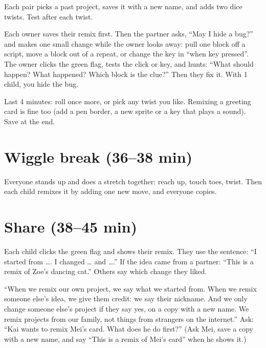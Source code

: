Each pair picks a past project, saves it with a new name, and adds two dice twists. Test after each twist.

\begin{bughunt}
Each owner saves their remix first. Then the partner asks, \enquote{May I hide a bug?} and makes one small change while the owner looks away: pull one block off a script, move a block out of a repeat, or change the key in \enquote{when key pressed}. The owner clicks the green flag, tests the click or key, and hunts: \enquote{What should happen? What happened? Which block is the clue?} Then they fix it. With 1 child, you hide the bug.
\end{bughunt}

\begin{freebuild}
Last 4 minutes: roll once more, or pick any twist you like. Remixing a greeting card is fine too (add a pen border, a new sprite or a key that plays a sound). Save at the end.
\end{freebuild}

\section{Wiggle break (36--38 min)}
Everyone stands up and does a stretch together: reach up, touch toes, twist. Then each child remixes it by adding one new move, and everyone copies.

\section{Share (38--45 min)}
\begin{teacherscript}
Each child clicks the green flag and shows their remix. They use the sentence: \enquote{I started from \ldots. I changed \ldots{} and \ldots.} If the idea came from a partner: \enquote{This is a remix of Zoe's dancing cat.} Others say which change they liked.
\end{teacherscript}

\begin{safety}
\enquote{When we remix our own project, we say what we started from. When we remix someone else's idea, we give them credit: we say their nickname. And we only change someone else's project if they say yes, on a copy with a new name. We remix projects from our family, not things from strangers on the internet.} Ask: \enquote{Kai wants to remix Mei's card. What does he do first?} (Ask Mei, save a copy with a new name, and say \enquote{This is a remix of Mei's card} when he shows it.)
\end{safety}

